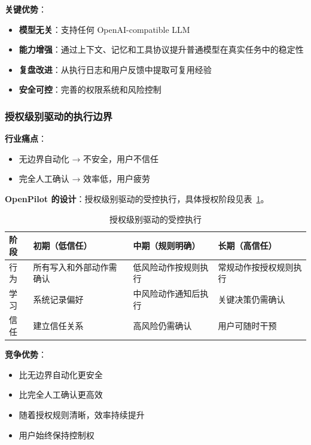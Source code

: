\documentclass[12pt,a4paper]{ctexart}
\begin{document}
\textbf{关键优势}：
\begin{itemize}
  \item \textbf{模型无关}：支持任何 OpenAI-compatible LLM
  \item \textbf{能力增强}：通过上下文、记忆和工具协议提升普通模型在真实任务中的稳定性
  \item \textbf{复盘改进}：从执行日志和用户反馈中提取可复用经验
  \item \textbf{安全可控}：完善的权限系统和风险控制
\end{itemize}

\subsubsection{授权级别驱动的执行边界}

\textbf{行业痛点}：
\begin{itemize}
  \item 无边界自动化 → 不安全，用户不信任
  \item 完全人工确认 → 效率低，用户疲劳
\end{itemize}

\textbf{OpenPilot 的设计}：授权级别驱动的受控执行，具体授权阶段见表~\ref{tab:confidence}。

\begin{table}[htbp]
  \centering
  \small
  \begin{tabularx}{\textwidth}{p{3cm} X X X}
    \toprule
    \textbf{阶段} & \textbf{初期（低信任）} & \textbf{中期（规则明确）} & \textbf{长期（高信任）} \\
    \midrule
    行为 & 所有写入和外部动作需确认 & 低风险动作按规则执行 & 常规动作按授权规则执行 \\
    学习 & 系统记录偏好 & 中风险动作通知后执行 & 关键决策仍需确认 \\
    信任 & 建立信任关系 & 高风险仍需确认 & 用户可随时干预 \\
    \bottomrule
  \end{tabularx}
  \caption{授权级别驱动的受控执行}
  \label{tab:confidence}
\end{table}

\textbf{竞争优势}：
\begin{itemize}
  \item 比无边界自动化更安全
  \item 比完全人工确认更高效
  \item 随着授权规则清晰，效率持续提升
  \item 用户始终保持控制权
\end{itemize}
\end{document}
